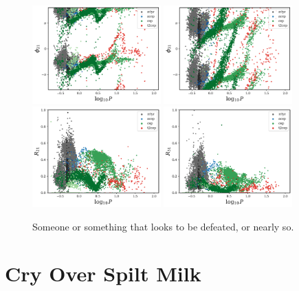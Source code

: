 \documentclass[letterpaper,12pt]{extarticle}
\begin{document}
\begin{figure}[H]
    \centering 
    \includegraphics[width=0.44\textwidth]{img/phi21_F12.png}
    \includegraphics[width=0.44\textwidth]{img/phi31_F12.png}
    \includegraphics[width=0.44\textwidth]{img/R21_F12.png}
    \includegraphics[width=0.44\textwidth]{img/R31_F12.png}
    \caption{
        Someone or something that looks to be defeated, or nearly so.
    } \label{fig:fourier-coeff}
\end{figure}

\section{Cry Over Spilt Milk}
\end{document}

